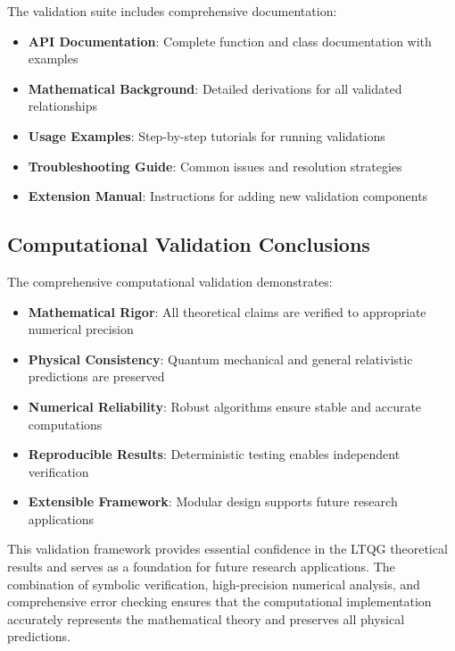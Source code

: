 The validation suite includes comprehensive documentation:

\begin{itemize}
\item \textbf{API Documentation}: Complete function and class documentation with examples
\item \textbf{Mathematical Background}: Detailed derivations for all validated relationships
\item \textbf{Usage Examples}: Step-by-step tutorials for running validations
\item \textbf{Troubleshooting Guide}: Common issues and resolution strategies
\item \textbf{Extension Manual}: Instructions for adding new validation components
\end{itemize}

\subsection{Computational Validation Conclusions}

The comprehensive computational validation demonstrates:

\begin{itemize}
\item \textbf{Mathematical Rigor}: All theoretical claims are verified to appropriate numerical precision
\item \textbf{Physical Consistency}: Quantum mechanical and general relativistic predictions are preserved
\item \textbf{Numerical Reliability}: Robust algorithms ensure stable and accurate computations
\item \textbf{Reproducible Results}: Deterministic testing enables independent verification
\item \textbf{Extensible Framework}: Modular design supports future research applications
\end{itemize}

This validation framework provides essential confidence in the LTQG theoretical results and serves as a foundation for future research applications. The combination of symbolic verification, high-precision numerical analysis, and comprehensive error checking ensures that the computational implementation accurately represents the mathematical theory and preserves all physical predictions.